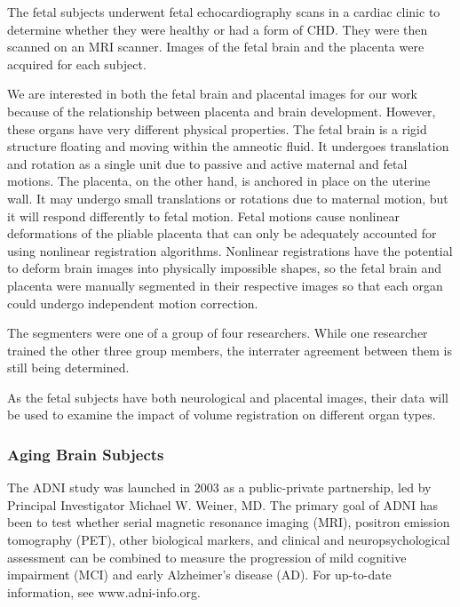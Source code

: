 The fetal subjects underwent fetal echocardiography scans in a cardiac clinic to determine whether they were healthy or had a form of CHD. They were then scanned on an MRI scanner. Images of the fetal brain and the placenta were acquired for each subject. 

We are interested in both the fetal brain and placental images for our work because of the relationship between placenta and brain development. However, these organs have very different physical properties. The fetal brain is a rigid structure floating and moving within the amneotic fluid. It undergoes translation and rotation as a single unit due to passive and active maternal and fetal motions. The placenta, on the other hand, is anchored in place on the uterine wall. It may undergo small translations or rotations due to maternal motion, but it will respond differently to fetal motion. Fetal motions cause nonlinear deformations of the pliable placenta that can only be adequately accounted for using nonlinear registration algorithms. Nonlinear registrations have the potential to deform brain images into physically impossible shapes, so the fetal brain and placenta were manually segmented in their respective images so that each organ could undergo independent motion correction. 

The segmenters were one of a group of four researchers. While one researcher trained the other three group members, the interrater agreement between them is still being determined.

As the fetal subjects have both neurological and placental images, their data will be used to examine the impact of volume registration on different organ types.



\subsubsection{Aging Brain Subjects}

The ADNI study was launched in 2003 as a public-private partnership, led by Principal Investigator Michael W. Weiner, MD. The primary goal of ADNI has been to test whether serial magnetic resonance imaging (MRI), positron emission tomography (PET), other biological markers, and clinical and neuropsychological assessment can be combined to measure the progression of mild cognitive impairment (MCI) and early Alzheimer's disease (AD). For up-to-date information, see www.adni-info.org.


